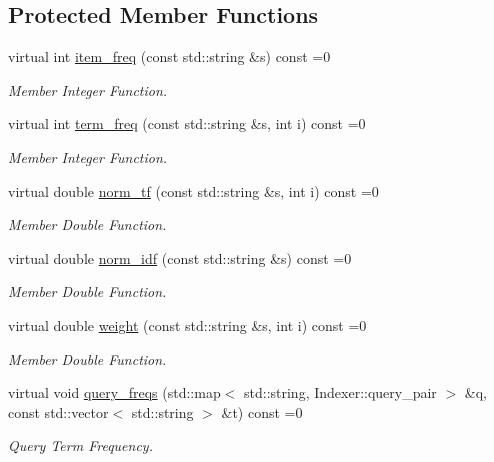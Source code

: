 \subsection*{Protected Member Functions}
\begin{DoxyCompactItemize}
\item 
virtual int \hyperlink{class_indexer_a9f9ea4d9946c531f257720cc9e9391eb}{item\+\_\+freq} (const std\+::string \&s) const =0
\begin{DoxyCompactList}\small\item\em Member Integer Function. \end{DoxyCompactList}\item 
virtual int \hyperlink{class_indexer_a96e17172c76abb679e7cd2ff4606ce4a}{term\+\_\+freq} (const std\+::string \&s, int i) const =0
\begin{DoxyCompactList}\small\item\em Member Integer Function. \end{DoxyCompactList}\item 
virtual double \hyperlink{class_indexer_aadcdca40938d27c465e564ac8852f02d}{norm\+\_\+tf} (const std\+::string \&s, int i) const =0
\begin{DoxyCompactList}\small\item\em Member Double Function. \end{DoxyCompactList}\item 
virtual double \hyperlink{class_indexer_af71c69a4267217969f21cba44822f263}{norm\+\_\+idf} (const std\+::string \&s) const =0
\begin{DoxyCompactList}\small\item\em Member Double Function. \end{DoxyCompactList}\item 
virtual double \hyperlink{class_indexer_a8301fcbdf40afd926ab71d4767575d32}{weight} (const std\+::string \&s, int i) const =0
\begin{DoxyCompactList}\small\item\em Member Double Function. \end{DoxyCompactList}\item 
virtual void \hyperlink{class_indexer_a0587f6a4d61620219473bf583ecdbad5}{query\+\_\+freqs} (std\+::map$<$ std\+::string, Indexer\+::query\+\_\+pair $>$ \&q, const std\+::vector$<$ std\+::string $>$ \&t) const =0
\begin{DoxyCompactList}\small\item\em Query Term Frequency. \end{DoxyCompactList}\item 

\end{DoxyCompactItemize}
